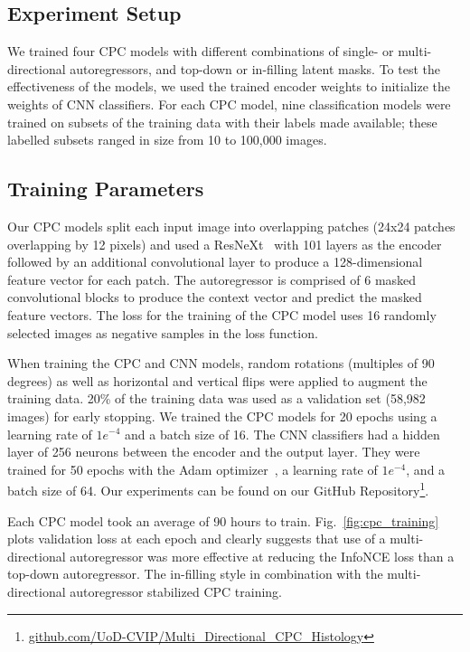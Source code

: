 \subsection{Experiment Setup}
We trained four CPC models with different combinations of single- or multi-directional autoregressors, and top-down or in-filling latent masks. To test the effectiveness of the models, we used the trained encoder weights to initialize the weights of CNN classifiers. For each CPC model, nine classification models were trained on subsets of the training data with their labels made available; these labelled subsets ranged in size from 10 to 100,000 images.

\subsection{Training Parameters}
Our CPC models split each input image into overlapping patches (24x24 patches overlapping by 12 pixels) and used a ResNeXt~\cite{xie2017aggregated} with 101 layers as the encoder followed by an additional convolutional layer to produce a 128-dimensional feature vector for each patch. The autoregressor is comprised of 6 masked convolutional blocks to produce the context vector and predict the masked feature vectors. The loss for the training of the CPC model uses 16 randomly selected images as negative samples in the loss function.

When training the CPC and CNN models, random rotations (multiples of 90 degrees) as well as horizontal and vertical flips were applied to augment the training data. 20\% of the training data was used as a validation set (58,982 images) for early stopping. We trained the CPC models for 20 epochs using a learning rate of \(1e^{-4}\) and a batch size of 16. The CNN classifiers had a hidden layer of 256 neurons between the encoder and the output layer. They were trained for 50 epochs with the Adam optimizer~\cite{kingma2014adam}, a learning rate of \(1e^{-4}\), and a batch size of 64. Our experiments can be found on our GitHub Repository\footnote{\url{github.com/UoD-CVIP/Multi_Directional_CPC_Histology}}.

Each CPC model took an average of 90 hours to train. Fig.~\ref{fig:cpc_training} plots validation loss at each epoch and clearly suggests that use of a multi-directional autoregressor was more effective at reducing the InfoNCE loss than a top-down autoregressor. The in-filling style in combination with the multi-directional autoregressor stabilized CPC training.

